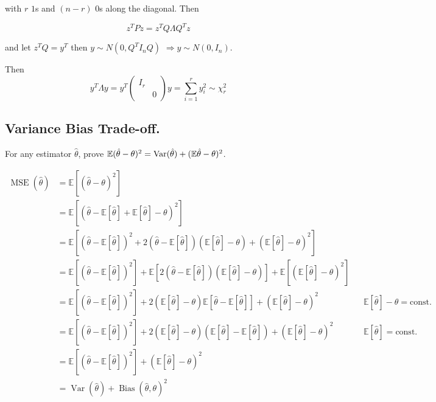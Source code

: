 \documentclass{tufte-book}
\begin{document}
with $r$ $1$s and $(n-r)$ $0$s along the diagonal.  Then

\[ z^TPz = z^T Q\Lambda Q^Tz \]

and let $z^TQ = y^T$ then $y \sim N(0, Q^TI_nQ)$ $\Rightarrow y \sim N(0, I_n)$.

Then
\[ y^T \Lambda y =y^T
\begin{pmatrix}
I_r & \ \\
\ & 0
\end{pmatrix}
y = \sum_{i=1}^r y_i^2 \sim \chi_r^2
\]
\subsection{Variance Bias Trade-off.}  For any estimator $\hat{\theta}$, prove $\mathbb{E}(\hat{\theta}-\theta)^2 = \operatorname{Var}(\hat{\theta})+ (\mathbb{E}\hat{\theta} - \theta)^2$.

\begin{align*}
\operatorname{MSE}(\hat{\theta}) &= \mathbb{E} \left [(\hat{\theta}-\theta)^2 \right ] \\
&=  \mathbb{E}\left[\left(\hat{\theta}-\mathbb{E} [\hat\theta]+\mathbb{E}[\hat\theta]-\theta\right)^2\right]\\
&= \mathbb{E}\left[\left(\hat{\theta}-\mathbb{E}[\hat\theta]\right)^2 +2\left (\hat{\theta}-\mathbb{E}[\hat\theta] \right ) \left (\mathbb{E}[\hat\theta]-\theta \right )+\left( \mathbb{E}[\hat\theta]-\theta \right)^2\right] \\
&= \mathbb{E}\left[\left(\hat{\theta}-\mathbb{E}[\hat\theta]\right)^2\right]+\mathbb{E}\left[2 \left (\hat{\theta}-\mathbb{E}[\hat\theta] \right ) \left (\mathbb{E}[\hat\theta]-\theta \right ) \right] + \mathbb{E}\left [ \left(\mathbb{E}[\hat\theta]-\theta\right)^2 \right] \\
&=  \mathbb{E}\left[\left(\hat{\theta}-\mathbb{E}[\hat\theta]\right)^2\right]+ 2 \left(\mathbb{E}[\hat\theta]-\theta\right) \mathbb{E}\left[\hat{\theta}-\mathbb{E}[\hat\theta] \right] +  \left(\mathbb{E}[\hat\theta]-\theta\right)^2 && \mathbb{E}[\hat\theta]-\theta = \text{const.} \\
&=  \mathbb{E}\left[\left(\hat{\theta}-\mathbb{E}[\hat\theta]\right)^2\right]+ 2 \left(\mathbb{E}[\hat\theta]-\theta\right) \left ( \mathbb{E}[\hat{\theta}]-\mathbb{E}[\hat\theta] \right )+  \left(\mathbb{E}[\hat\theta]-\theta\right)^2 && \mathbb{E}[\hat\theta] = \text{const.} \\
&= \mathbb{E}\left[\left(\hat{\theta}-\mathbb{E}[\hat\theta]\right)^2\right]+\left(\mathbb{E}[\hat\theta]-\theta\right)^2\\
&= \operatorname{Var}(\hat\theta)+ \operatorname{Bias}(\hat\theta,\theta)^2
\end{align*}
\end{document}

